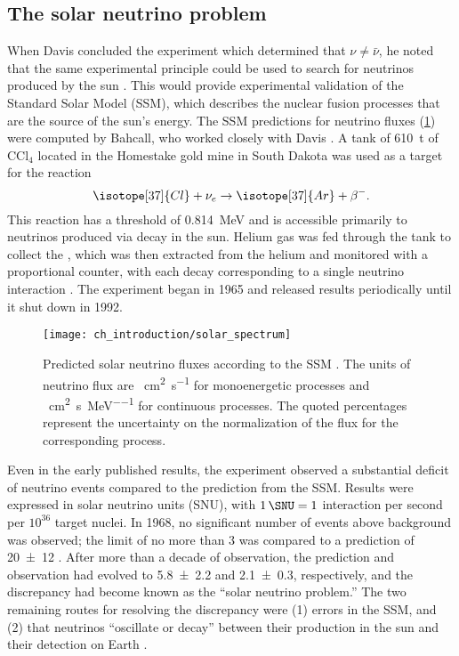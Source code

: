 \subsection{The solar neutrino problem}
\label{subsec:homestake}

When Davis concluded the experiment which determined that $\nu\neq\bar{\nu}$,
he noted that the same experimental principle could be used
to search for neutrinos produced by the sun \cite{davis_diff_nuebar}.
This would provide experimental validation of the Standard Solar Model (SSM),
which describes the nuclear fusion processes
that are the source of the sun's energy.
The SSM predictions for neutrino fluxes (\cref{fig:solarflux})
were computed by Bahcall,
who worked closely with Davis \cite{bahcall2004}.
A tank of \SI{610}{\tonne} of $\text{CCl}_4$
located in the Homestake gold mine in South Dakota
was used as a target for the reaction
\begin{equation}\label{eq:davis_nu}
    \isotope[37]{Cl} + \nu_e \to \isotope[37]{Ar} + \beta^-.
\end{equation}
This reaction has a threshold of \SI{0.814}{\MeV} \cite{solar_review}
and is accessible primarily to neutrinos
produced via  decay in the sun.
Helium gas was fed through the tank
to collect the ,
which was then extracted from the helium
and monitored with a proportional counter,
with each decay corresponding to a single neutrino interaction \cite{homestake1968}.
The experiment began in 1965 and released results periodically
until it shut down in 1992.

\begin{figure}
    \centering
    \texttt{[image: ch\_introduction/solar\_spectrum]}
    \caption{
        Predicted solar neutrino fluxes according to the SSM \cite{bahcall2004}.
        The units of neutrino flux are
        \si[per-mode=reciprocal]{\per\square\cm\per\second} for monoenergetic processes
        and \si[per-mode=reciprocal]{\per\square\cm\per\second\per\MeV}
        for continuous processes.
        The quoted percentages represent the uncertainty
        on the normalization of the flux for the corresponding process.
    }
    \label{fig:solarflux}
\end{figure}

Even in the early published results,
the experiment observed a substantial deficit of neutrino events
compared to the prediction from the SSM.
Results were expressed in solar neutrino units (SNU),
with $\SI{1}{\SNU} = 1$ interaction per second per $10^{36}$ target nuclei.
In 1968, no significant number of events above background was observed;
the limit of no more than \SI{3}{\SNU} was compared to a prediction of
\SI{20\pm12}{\SNU} \cite{homestake1968}.
After more than a decade of observation,
the prediction and observation had evolved to \SI{5.8\pm2.2}{\SNU}
and \SI{2.1\pm0.3}{\SNU}, respectively,
and the discrepancy had become known as the ``solar neutrino problem.''
The two remaining routes for resolving the discrepancy were
(1) errors in the SSM, and (2) that neutrinos ``oscillate or decay''
between their production in the sun and their detection on Earth \cite{davis1985}.

